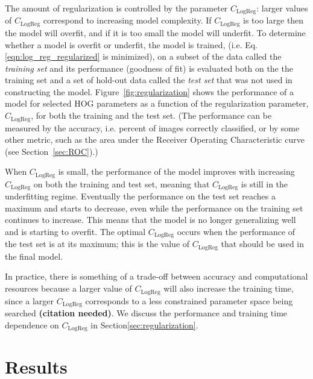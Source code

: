 \documentclass{emulateapj}
\newcommand{\todo}[1]{{\bf\color{blue} #1}}
\begin{document}
The amount of regularization is controlled by the parameter
$C_\text{LogReg}$: larger values of $C_\text{LogReg}$ correspond to
increasing model complexity.  If $C_\text{LogReg}$ is too large then
the model will overfit, and if it is too small the model will
underfit.  To determine whether a model is overfit or underfit, the
model is trained, (i.e. Eq. \ref{eqn:log_reg_regularized} is
minimized), on a subset of the data called the {\em{training set}} and
its performance (goodness of fit) is evaluated both on the the
training set and a set of hold-out data called the {\em{test set}}
that was not used in constructing the model.
Figure~\ref{fig:regularization} shows the performance of a model for
selected HOG parameters as a function of the regularization parameter,
$C_\text{LogReg}$, for both the training and the test set.  (The
performance can be measured by the accuracy, i.e. percent of images
correctly classified, or by some other metric, such as the area under
the Receiver Operating Characteristic curve (see
Section~\ref{sec:ROC}).)

When $C_\text{LogReg}$ is small, the performance of the model improves
with increasing $C_\text{LogReg}$ on both the training and test set,
meaning that $C_\text{LogReg}$ is
still in the underfitting regime. Eventually the performance on the
test set reaches a maximum and starts to decrease, even while the
performance on the training set continues to increase.  This means
that the model is no longer generalizing well and is starting to
overfit. The optimal $C_\text{LogReg}$ occurs when the performance
of the test set is at its maximum; this is the value of $C_\text{LogReg}$
that should be used in the final model.

In practice, there is something of a trade-off between accuracy and
computational resources because a larger value of $C_\text{LogReg}$
will also increase the training time, since a larger $C_\text{LogReg}$
corresponds to a less constrained parameter space being searched
\todo{(citation needed)}.
We discuss the performance and training time dependence on $C_\text{LogReg}$
in Section\ref{sec:regularization}.

\section{Results}
\label{sec:results}

\end{document}
